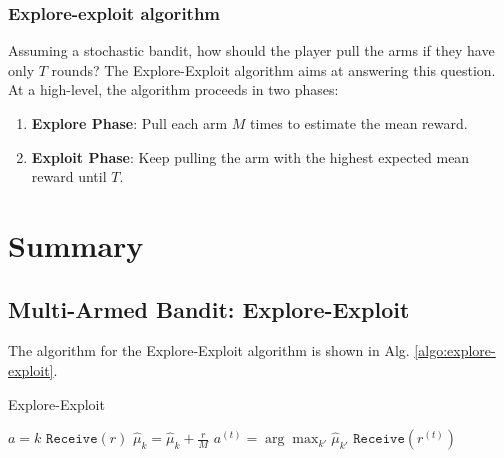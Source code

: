 \documentclass[11pt]{article}
\begin{document}
\subsubsection{Explore-exploit algorithm}
Assuming a stochastic bandit, how should the player pull the arms if they have only $T$ rounds? The
Explore-Exploit algorithm aims at answering this question. At a high-level, the algorithm proceeds in two
phases:
\begin{enumerate}
    \item \textbf{Explore Phase}: Pull each arm $M$ times to estimate the mean reward.
    \item \textbf{Exploit Phase}: Keep pulling the arm with the highest expected mean reward until $T$.
\end{enumerate}



\section{Summary}

\subsection{Multi-Armed Bandit: Explore-Exploit}
The algorithm for the Explore-Exploit algorithm is shown in Alg. \ref{algo:explore-exploit}.
\begin{algorithm}
\caption{Explore-Exploit}
\label{algo:explore-exploit}
\begin{algorithmic}[1]
\STATE $a = k$
\STATE $\mathtt{Receive}(r)$
\STATE $\hat{\mu}_k = \hat{\mu}_k + \frac{r}{M}$
\ENDFOR
\ENDFOR
{}
\STATE $a^{(t)} = \arg \max_{k'} \hat{\mu}_{k'}$
\STATE $\mathtt{Receive}(r^{(t)})$
\ENDFOR
\end{algorithmic}
\end{algorithm}

\end{document}
